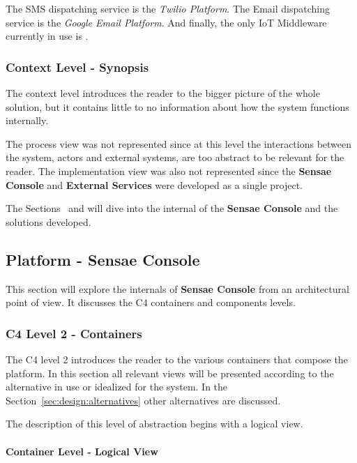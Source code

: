 The SMS dispatching service is the \textit{Twilio Platform}. The Email dispatching service is the \textit{Google Email Platform}. And finally, the only \gls{IoT} Middleware currently in use is \cite{helium}.

\subsubsection{Context Level - Synopsis}
\label{subsubsec:design:architecture:context:synopsis}

The context level introduces the reader to the bigger picture of the whole solution, but it contains little to no information about how the system functions internally.

The process view was not represented since at this level the interactions between the system, actors and external systems, are too abstract to be relevant for the reader.
The implementation view was also not represented since the \textbf{Sensae Console} and \textbf{External Services} were developed as a single project.

The Sections~ and  will dive into the internal of the \textbf{Sensae Console} and the solutions developed.

\subsection{Platform - Sensae Console}
\label{subsec:design:architecture:platform}

This section will explore the internals of \textbf{Sensae Console} from an architectural point of view. It discusses the C4 containers and components levels.

\subsubsection{C4 Level 2 - Containers}
\label{subsubsec:design:architecture:platform:containers}

The C4 level 2 introduces the reader to the various containers that compose the platform. In this section all relevant views will be presented according to the alternative in use or idealized for the system. In the Section~\ref{sec:design:alternatives} other alternatives are discussed.

The description of this level of abstraction begins with a logical view.

\paragraph{Container Level - Logical View}
\label{par:design:architecture:platform:container:logical}

